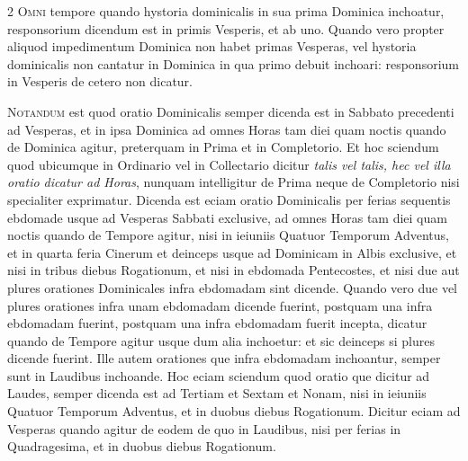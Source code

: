 \begin{multicols*}{2}
{\color{Red} }
\lettrine[lines=2]{\zallmancaps \color{Red} O}{mni} tempore quando hystoria dominicalis in sua prima Dominica inchoatur, responsorium dicendum est in primis Vesperis, et ab uno. Quando vero propter aliquod impedimentum Dominica non habet primas Vesperas, vel hystoria dominicalis non cantatur in Dominica in qua primo debuit inchoari: responsorium in Vesperis de cetero non dicatur.

{\color{Red} }
\lettrine[lines=2]{\zallmancaps \color{Blue} N}{otandum} est quod oratio Dominicalis semper dicenda est in Sabbato precedenti ad Vesperas, et in ipsa Dominica ad omnes Horas tam diei quam noctis quando de Dominica agitur, preterquam in Prima et in Completorio. Et hoc sciendum quod ubicumque in Ordinario vel in Collectario dicitur \textit{talis vel talis, hec vel illa oratio dicatur ad Horas}, nunquam intelligitur de Prima neque de Completorio nisi specialiter exprimatur. Dicenda est eciam oratio Dominicalis per ferias sequentis ebdomade usque ad Vesperas Sabbati exclusive, ad omnes Horas tam diei quam noctis quando de Tempore agitur, nisi in ieiuniis Quatuor Temporum Adventus, et in quarta feria Cinerum et deinceps usque ad Dominicam in Albis exclusive, et nisi in tribus diebus Rogationum, et nisi in ebdomada Pentecostes, et nisi due aut plures orationes Dominicales infra ebdomadam sint dicende. Quando vero due vel plures orationes infra unam ebdomadam dicende fuerint, postquam una infra ebdomadam fuerint, postquam una infra ebdomadam fuerit incepta, dicatur quando de Tempore agitur usque dum alia inchoetur: et sic deinceps si plures dicende fuerint.
Ille autem orationes que infra ebdomadam inchoantur, semper sunt in Laudibus inchoande. Hoc eciam sciendum quod oratio que dicitur ad Laudes, semper dicenda est ad Tertiam et Sextam et Nonam, nisi in ieiuniis Quatuor Temporum Adventus, et in duobus diebus Rogationum. Dicitur eciam ad Vesperas quando agitur de eodem de quo in Laudibus, nisi per ferias in Quadragesima, et in duobus diebus Rogationum.


\end{multicols*}
